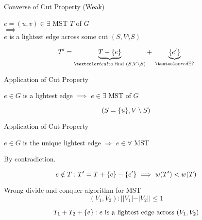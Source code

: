 \begin{frame}{}
  \begin{exampleblock}{Converse of Cut Property (Weak)}
    \begin{center}
      $e = (u,v) \in \exists$ MST $T$ of $G$ \\[6pt]
      $\implies$ \\[6pt]
      $e$ is a lightest edge across some cut $(S, V \setminus S)$
    \end{center}
  \end{exampleblock}

  \pause
  \[
    T' = \underbrace{T - \set{e}}_{\teal{\text{to find } (S, V \setminus S)}} +\; \underbrace{\set{e'}}_{\red{\exists?}}
  \]
\end{frame}

\begin{frame}{}
  \begin{exampleblock}{Application of Cut Property }
    \centerline{$e \in G$ is a lightest edge $\implies$ $e \in \exists$ MST of $G$}
  \end{exampleblock}

  \pause
  \[
    (S = \{u\}, V \setminus S)
  \]
\end{frame}

\begin{frame}{}
  \begin{exampleblock}{Application of Cut Property }
    \centerline{$e \in G$ is the unique lightest edge $\Rightarrow$ $e \in \forall$ MST}
  \end{exampleblock}

  \pause
  \vspace{0.50cm}
  \centerline{By contradiction.}
  \[
    e \notin T: T' = T + \{e\} - \{e'\} \implies w(T') < w(T)
  \]
\end{frame}

\begin{frame}{}
  \begin{exampleblock}{Wrong divide-and-conquer algorithm for MST }
    \[
      (V_{1}, V_{2}): ||V_{1}| - |V_{2}|| \le 1
    \]
    
    \[
      T_{1} + T_{2} + \{e\}: e \text{ is a lightest edge across } (V_{1}, V_{2})
    \]
  \end{exampleblock}

  \pause
  \vspace{0.30cm}
\end{frame}


